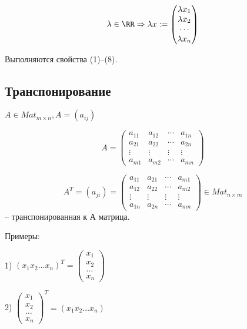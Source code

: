 \begin{equation*}\lambda \in \RR \Rightarrow \lambda x := \begin{pmatrix}
\lambda x_1 \\
\lambda x_2 \\
\cdots \\
\lambda x_n 
\end{pmatrix}
\end{equation*}

Выполняются свойства (1)--(8).

\bigskip
\subsection{Транспонирование}

$A \in Mat_{m \times n}, A = (a_{ij})$

\begin{equation*}A = 
	\begin{pmatrix}
		a_{11} & a_{12} & \cdots & a_{1n} \\
		a_{21} & a_{22} & \cdots & a_{2n} \\
       \vdots & \vdots & \vdots& \vdots \\ 
       a_{m1} & a_{m2} & \cdots & a_{mn}
	\end{pmatrix}
\end{equation*}

\begin{equation*} A^T = (a_{ji}) = 
	\begin{pmatrix}
		a_{11} & a_{21} & \cdots & a_{m1} \\
		a_{12} & a_{22} & \cdots & a_{m2} \\
       \vdots & \vdots & \vdots& \vdots \\ 
       a_{1n} & a_{2n} & \cdots & a_{mn}
	\end{pmatrix} \in Mat_{n \times m}
\end{equation*} 
-- транспонированная к А матрица.

\bigskip
Примеры:

1) $(x_1 x_2 \dots x_n)^T = \begin{pmatrix} x_1 \\ x_2 \\ \dots \\ x_n \end{pmatrix}$

2) $\begin{pmatrix} x_1 \\ x_2 \\ \dots \\ x_n \end{pmatrix}^T = (x_1 x_2 \dots x_n)$

